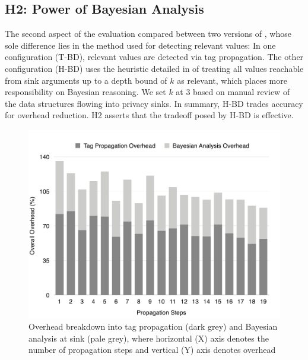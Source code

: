 \subsection{H2: Power of Bayesian Analysis}\label{Se:practical}

The second aspect of the evaluation compared between two versions of \Tool, whose sole difference lies in the method used for detecting relevant values: In one configuration (T-BD), relevant values are detected via tag propagation. The other configuration (H-BD) uses the heuristic detailed in  of treating all values reachable from sink arguments  up to a depth bound of $k$ as relevant, which places more responsibility on Bayesian reasoning. We set $k$ at 3 based on manual review of the data structures flowing into privacy sinks. In summary, H-BD trades accuracy for overhead reduction. H2 asserts that the tradeoff posed by H-BD is effective. 


\begin{figure}
\includegraphics[width=\columnwidth]{OverheadDiagram.pdf}
\caption{\label{Fi:overhead}Overhead breakdown into tag propagation (dark grey) and Bayesian analysis at sink (pale grey), where horizontal (X) axis denotes the number of propagation steps and vertical (Y) axis denotes overhead}
\end{figure}

